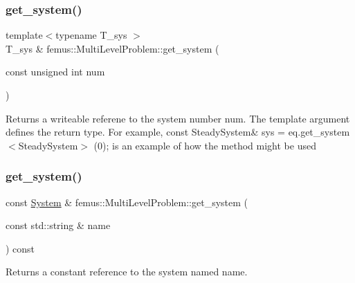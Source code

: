 \subsubsection{\texorpdfstring{get\+\_\+system()}{get\_system()}\hspace{0.1cm}{\footnotesize\ttfamily [4/8]}}
{\footnotesize\ttfamily template$<$typename T\+\_\+sys $>$ \\
T\+\_\+sys \& femus\+::\+Multi\+Level\+Problem\+::get\+\_\+system (\begin{DoxyParamCaption}\item[{const unsigned int}]{num }\end{DoxyParamCaption})\hspace{0.3cm}{\ttfamily [inline]}}

\begin{DoxyReturn}{Returns}
a writeable referene to the system number {\ttfamily num}. The template argument defines the return type. For example, const Steady\+System\& sys = eq.\+get\+\_\+system$<$\+Steady\+System$>$ (0); is an example of how the method might be used 
\end{DoxyReturn}
\mbox{\label{classfemus_1_1_multi_level_problem_a1c5846c64c392348743a2a7b23cef9e7}} 
\subsubsection{\texorpdfstring{get\+\_\+system()}{get\_system()}\hspace{0.1cm}{\footnotesize\ttfamily [5/8]}}
{\footnotesize\ttfamily const \mbox{\hyperlink{classfemus_1_1_system}{System}} \& femus\+::\+Multi\+Level\+Problem\+::get\+\_\+system (\begin{DoxyParamCaption}\item[{const std\+::string \&}]{name }\end{DoxyParamCaption}) const\hspace{0.3cm}{\ttfamily [inline]}}

\begin{DoxyReturn}{Returns}
a constant reference to the system named {\ttfamily name}. 
\end{DoxyReturn}
\mbox{\label{classfemus_1_1_multi_level_problem_aa83c691a43510a2dc63be58ec7ee70b4}} 
